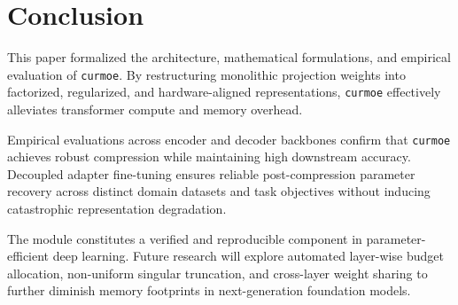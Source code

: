 \section{Conclusion}
This paper formalized the architecture, mathematical formulations, and empirical evaluation of \texttt{curmoe}. By restructuring monolithic projection weights into factorized, regularized, and hardware-aligned representations, \texttt{curmoe} effectively alleviates transformer compute and memory overhead.

Empirical evaluations across encoder and decoder backbones confirm that \texttt{curmoe} achieves robust compression while maintaining high downstream accuracy. Decoupled adapter fine-tuning ensures reliable post-compression parameter recovery across distinct domain datasets and task objectives without inducing catastrophic representation degradation.

The module constitutes a verified and reproducible component in parameter-efficient deep learning. Future research will explore automated layer-wise budget allocation, non-uniform singular truncation, and cross-layer weight sharing to further diminish memory footprints in next-generation foundation models.
